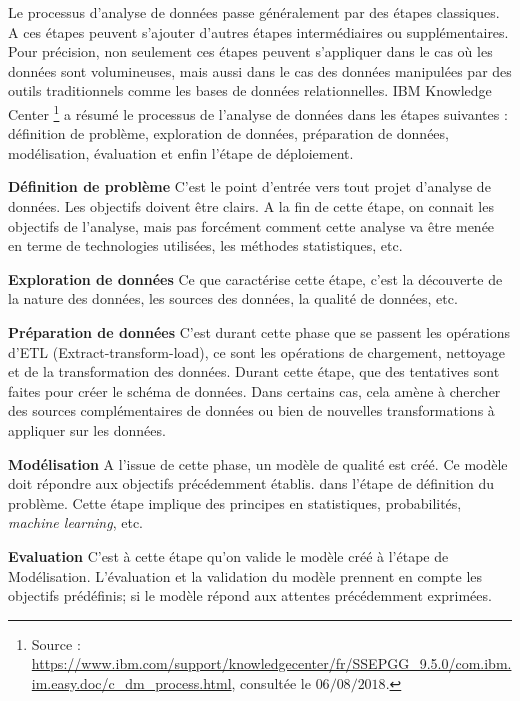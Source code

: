 Le processus d'analyse de données passe généralement par des étapes classiques. A ces étapes peuvent s'ajouter d'autres étapes intermédiaires ou supplémentaires. 
Pour précision, non seulement  ces étapes peuvent s'appliquer dans le cas  où les données sont volumineuses,  mais aussi dans le cas des données manipulées par des outils traditionnels comme les bases de données relationnelles. IBM Knowledge Center \footnote{Source : \url{https://www.ibm.com/support/knowledgecenter/fr/SSEPGG_9.5.0/com.ibm.im.easy.doc/c_dm_process.html}, consultée le $06/08/2018$.} a résumé le processus de l'analyse de données dans les étapes suivantes :
définition de problème, exploration de données, préparation de données, modélisation, évaluation et enfin l'étape de déploiement.


\textbf{Définition de problème} C'est le point d'entrée vers tout projet d'analyse de données. Les objectifs doivent être clairs. A la fin de cette étape, on connait les objectifs de l'analyse, mais pas forcément comment cette analyse va être menée en terme de technologies utilisées,  les méthodes statistiques, etc. \par

\textbf{Exploration de données } Ce que caractérise cette étape, c'est la découverte de la nature  des données, les sources des données, la qualité de données, etc. \par

\textbf{Préparation de données} \label{par:step-preparedata} C'est durant cette phase que se passent les opérations d'ETL (Extract-transform-load), ce sont les opérations de chargement,  nettoyage et de la transformation des données. Durant cette étape,  que  des tentatives sont faites pour créer le schéma de données.  Dans certains cas, cela amène  à chercher des sources complémentaires de données ou bien de nouvelles transformations à appliquer sur les données. \par

\textbf{Modélisation} A l'issue de cette phase, un modèle de qualité est créé. Ce modèle  doit  répondre aux objectifs précédemment établis. dans l'étape de définition du problème. Cette étape implique des principes en statistiques, probabilités, \textit{machine learning}, etc. \par

\textbf{Evaluation} C'est à cette étape qu'on valide le modèle créé à l'étape de  Modélisation. L'évaluation et la validation du modèle prennent en compte les objectifs prédéfinis; si le modèle répond aux attentes précédemment exprimées. \par


